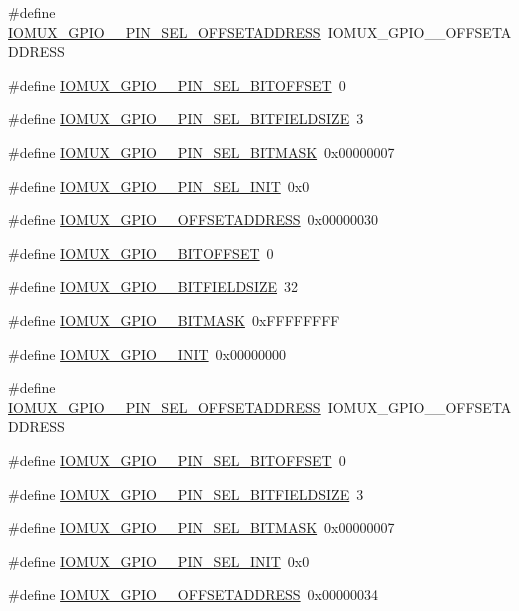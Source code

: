 \begin{DoxyCompactItemize}
\item 
\#define \hyperlink{a00560_a0788d252441b39eb9dfc9e2405e0cebd}{IOMUX\_\-GPIO\_\_\-PIN\_\-SEL\_\-OFFSETADDRESS}~IOMUX\_\-GPIO\_\_\-OFFSETADDRESS
\item 
\#define \hyperlink{a00560_a22714eb4941b60922b1289aa86cb4d47}{IOMUX\_\-GPIO\_\_\-PIN\_\-SEL\_\-BITOFFSET}~0
\item 
\#define \hyperlink{a00560_a2026e687a1193908467c75228491d305}{IOMUX\_\-GPIO\_\_\-PIN\_\-SEL\_\-BITFIELDSIZE}~3
\item 
\#define \hyperlink{a00560_a4d2d00cd4d053ac76d9190663bc6c93d}{IOMUX\_\-GPIO\_\_\-PIN\_\-SEL\_\-BITMASK}~0x00000007
\item 
\#define \hyperlink{a00560_a4357875ceed5ee3d9bbadabc3c7fb4c8}{IOMUX\_\-GPIO\_\_\-PIN\_\-SEL\_\-INIT}~0x0
\item 
\#define \hyperlink{a00560_abdea94bd8834365c2975a904ced5bf60}{IOMUX\_\-GPIO\_\_\-OFFSETADDRESS}~0x00000030
\item 
\#define \hyperlink{a00560_aa86ac2cbab3e1c658e5169897064c8f5}{IOMUX\_\-GPIO\_\_\-BITOFFSET}~0
\item 
\#define \hyperlink{a00560_a56de557b16460788f65d2387f257eca5}{IOMUX\_\-GPIO\_\_\-BITFIELDSIZE}~32
\item 
\#define \hyperlink{a00560_ad584c49008c26277448d0a8a73e9b085}{IOMUX\_\-GPIO\_\_\-BITMASK}~0xFFFFFFFF
\item 
\#define \hyperlink{a00560_a17fd83ad3cec645602fada7282b338c6}{IOMUX\_\-GPIO\_\_\-INIT}~0x00000000
\item 
\#define \hyperlink{a00560_a7a567d4869d5c85a80921fbd40b8a71a}{IOMUX\_\-GPIO\_\_\-PIN\_\-SEL\_\-OFFSETADDRESS}~IOMUX\_\-GPIO\_\_\-OFFSETADDRESS
\item 
\#define \hyperlink{a00560_a7684879175a4b05ada1736faf213adc2}{IOMUX\_\-GPIO\_\_\-PIN\_\-SEL\_\-BITOFFSET}~0
\item 
\#define \hyperlink{a00560_a5dbf6a7313d4f7f19df986c78759157c}{IOMUX\_\-GPIO\_\_\-PIN\_\-SEL\_\-BITFIELDSIZE}~3
\item 
\#define \hyperlink{a00560_aad293944da07bfa7b3cad78dac3a215b}{IOMUX\_\-GPIO\_\_\-PIN\_\-SEL\_\-BITMASK}~0x00000007
\item 
\#define \hyperlink{a00560_a15f748d184649633b9a448d1f549049a}{IOMUX\_\-GPIO\_\_\-PIN\_\-SEL\_\-INIT}~0x0
\item 
\#define \hyperlink{a00560_a2cbbe1f4c354e1f26c6e78c6c66f0b6d}{IOMUX\_\-GPIO\_\_\-OFFSETADDRESS}~0x00000034
\item 

\end{DoxyCompactItemize}

